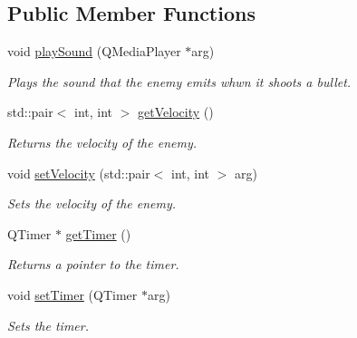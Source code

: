 \subsection*{Public Member Functions}
\begin{DoxyCompactItemize}
\item 
\mbox{\label{classEnemy_ad737566e8e9dfb500dd3e177d27cb7f0}} 
void \hyperlink{classEnemy_ad737566e8e9dfb500dd3e177d27cb7f0}{play\+Sound} (Q\+Media\+Player $\ast$arg)
\begin{DoxyCompactList}\small\item\em Plays the sound that the enemy emits whwn it shoots a bullet. \end{DoxyCompactList}\item 
\mbox{\label{classEnemy_a4c66609d3acb845f8cf822e0b47d2c05}} 
std\+::pair$<$ int, int $>$ \hyperlink{classEnemy_a4c66609d3acb845f8cf822e0b47d2c05}{get\+Velocity} ()
\begin{DoxyCompactList}\small\item\em Returns the velocity of the enemy. \end{DoxyCompactList}\item 
\mbox{\label{classEnemy_a01b9949a62e439e49cfe95e0ddecb7fe}} 
void \hyperlink{classEnemy_a01b9949a62e439e49cfe95e0ddecb7fe}{set\+Velocity} (std\+::pair$<$ int, int $>$ arg)
\begin{DoxyCompactList}\small\item\em Sets the velocity of the enemy. \end{DoxyCompactList}\item 
\mbox{\label{classEnemy_abe323b8ed67ea623ffb4bab4ff6589e8}} 
Q\+Timer $\ast$ \hyperlink{classEnemy_abe323b8ed67ea623ffb4bab4ff6589e8}{get\+Timer} ()
\begin{DoxyCompactList}\small\item\em Returns a pointer to the timer. \end{DoxyCompactList}\item 
\mbox{\label{classEnemy_ab30ff18d935a67f440bec8d07d48e2e2}} 
void \hyperlink{classEnemy_ab30ff18d935a67f440bec8d07d48e2e2}{set\+Timer} (Q\+Timer $\ast$arg)
\begin{DoxyCompactList}\small\item\em Sets the timer. \end{DoxyCompactList}\item 

\end{DoxyCompactItemize}
